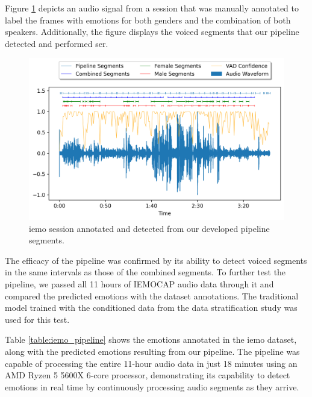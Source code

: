 Figure \ref{fig:iemo_pipeline} depicts an audio signal from a session that was manually annotated to label the frames with emotions for both genders and the combination of both speakers. Additionally, the figure displays the voiced segments that our pipeline detected and performed \ac{ser}.

\begin{figure}[H]
	\centering
	\includegraphics[width=\textwidth]{figs/6_video_conf_ser/pipeline.png}
	\caption{\ac{iemo} session annotated and detected from our developed pipeline segments.}
	\label{fig:iemo_pipeline}
\end{figure}

The efficacy of the pipeline was confirmed by its ability to detect voiced segments in the same intervals as those of the combined segments. To further test the pipeline, we passed all 11 hours of IEMOCAP audio data through it and compared the predicted emotions with the dataset annotations. The traditional model trained with the conditioned data from the data stratification study was used for this test.

Table \ref{table:iemo_pipeline} shows the emotions annotated in the \ac{iemo} dataset, along with the predicted emotions resulting from our pipeline. The pipeline was capable of processing the entire 11-hour audio data in just 18 minutes using an AMD Ryzen 5 5600X 6-core processor, demonstrating its capability to detect emotions in real time by continuously processing audio segments as they arrive.

